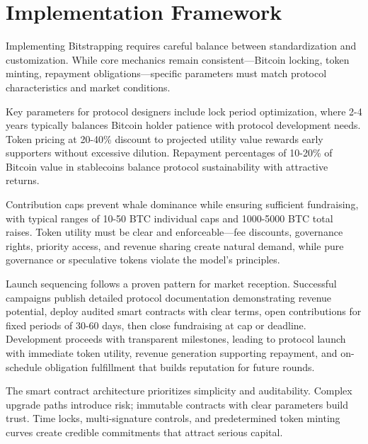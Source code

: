 \section{Implementation Framework}

Implementing Bitstrapping requires careful balance between standardization and customization. While core mechanics remain consistent—Bitcoin locking, token minting, repayment obligations—specific parameters must match protocol characteristics and market conditions.

Key parameters for protocol designers include lock period optimization, where 2-4 years typically balances Bitcoin holder patience with protocol development needs. Token pricing at 20-40\% discount to projected utility value rewards early supporters without excessive dilution. Repayment percentages of 10-20\% of Bitcoin value in stablecoins balance protocol sustainability with attractive returns.

Contribution caps prevent whale dominance while ensuring sufficient fundraising, with typical ranges of 10-50 BTC individual caps and 1000-5000 BTC total raises. Token utility must be clear and enforceable—fee discounts, governance rights, priority access, and revenue sharing create natural demand, while pure governance or speculative tokens violate the model's principles.

Launch sequencing follows a proven pattern for market reception. Successful campaigns publish detailed protocol documentation demonstrating revenue potential, deploy audited smart contracts with clear terms, open contributions for fixed periods of 30-60 days, then close fundraising at cap or deadline. Development proceeds with transparent milestones, leading to protocol launch with immediate token utility, revenue generation supporting repayment, and on-schedule obligation fulfillment that builds reputation for future rounds.

The smart contract architecture prioritizes simplicity and auditability. Complex upgrade paths introduce risk; immutable contracts with clear parameters build trust. Time locks, multi-signature controls, and predetermined token minting curves create credible commitments that attract serious capital.

